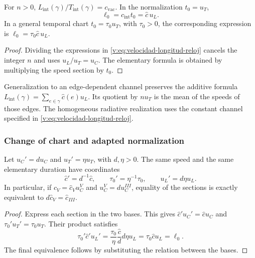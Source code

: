 \begin{corollary}
\label{v:cor:longitud-elemental-constitutiva}
For $n>0$, $L_{\mathrm{int}}(\gamma)/T_{\mathrm{int}}(\gamma)
=c_{\mathrm{vac}}$. In the normalization $t_0=u_T$,
\begin{equation}
 \ell_0=c_{\mathrm{int}}t_0=\widehat c\,u_L.
 \label{v:eq:longitud-elemental-constitutiva}
\end{equation}
In a general temporal chart $t_0=\tau_0u_T$, with $\tau_0>0$,
the corresponding expression is $\ell_0=\tau_0\widehat c\,u_L$.
\end{corollary}
\begin{proof}
Dividing the expressions in \eqref{v:eq:velocidad-longitud-reloj} cancels the integer
$n$ and uses $u_L/u_T=u_C$. The elementary formula is obtained
by multiplying the speed section by $t_0$.
\end{proof}

Generalization to an edge-dependent channel preserves the additive
formula $L_{\mathrm{int}}(\gamma)=\sum_{e\in\gamma}\widehat c(e)u_L$.
Its quotient by $nu_T$ is the mean of the speeds of those edges.
The homogeneous radiative realization uses the constant channel specified
in \eqref{v:eq:velocidad-longitud-reloj}.

\subsubsection{Change of chart and adapted normalization}

\begin{proposition}
\label{v:prop:covariancia-identidad-velocidad}
Let $u_C'=d u_C$ and $u_T'=\eta u_T$, with $d,\eta>0$.
The same speed and the same elementary duration have coordinates
\begin{equation}
 \widehat c'=d^{-1}\widehat c,
 \qquad \tau_0'=\eta^{-1}\tau_0,
 \qquad u_L'=d\eta u_L.
 \label{v:eq:velocidad-cambio-carta}
\end{equation}
In particular, if $c_V=\widehat c_Vu_C^V$ and
$u_C^V=d u_C^{III}$, equality of the sections is exactly equivalent to
$d\widehat c_V=\widehat c_{III}$.
\end{proposition}
\begin{proof}
Express each section in the two bases. This gives
$\widehat c'u_C'=\widehat c u_C$ and
$\tau_0'u_T'=\tau_0u_T$. Their product satisfies
\[
 \tau_0'\widehat c' u_L'
 =\frac{\tau_0}{\eta}\frac{\widehat c}{d}
       d\eta u_L
 =\tau_0\widehat c u_L=\ell_0.
\]
The final equivalence follows by substituting the relation between the bases.
\end{proof}

